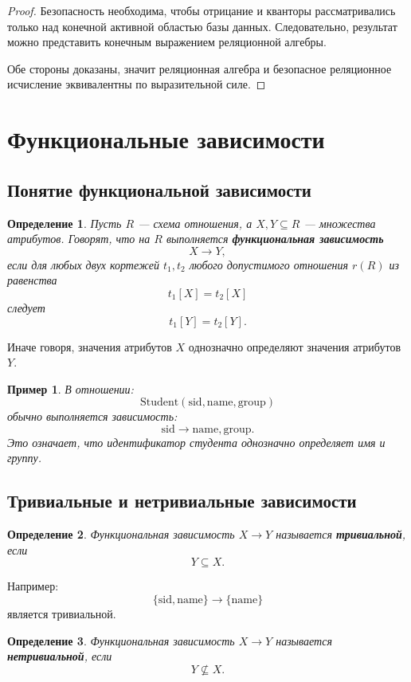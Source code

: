 \documentclass[12pt,a4paper]{article}
\newtheorem{definition}{Определение}[section]
\newtheorem{example}{Пример}[section]
\theoremstyle{remark}
\begin{document}
\begin{proof}
Безопасность необходима, чтобы отрицание и кванторы рассматривались только над конечной активной областью базы данных. Следовательно, результат можно представить конечным выражением реляционной алгебры.

Обе стороны доказаны, значит реляционная алгебра и безопасное реляционное исчисление эквивалентны по выразительной силе.
\end{proof}

\section{Функциональные зависимости}

\subsection{Понятие функциональной зависимости}

\begin{definition}
Пусть $R$ --- схема отношения, а $X,Y \subseteq R$ --- множества атрибутов.
Говорят, что на $R$ выполняется \textbf{функциональная зависимость}
\[
X \to Y,
\]
если для любых двух кортежей $t_1,t_2$ любого допустимого отношения $r(R)$ из равенства
\[
t_1[X] = t_2[X]
\]
следует
\[
t_1[Y] = t_2[Y].
\]
\end{definition}

Иначе говоря, значения атрибутов $X$ однозначно определяют значения атрибутов $Y$.

\begin{example}
В отношении:
\[
\text{Student}(\text{sid}, \text{name}, \text{group})
\]
обычно выполняется зависимость:
\[
\text{sid} \to \text{name}, \text{group}.
\]
Это означает, что идентификатор студента однозначно определяет имя и группу.
\end{example}

\subsection{Тривиальные и нетривиальные зависимости}

\begin{definition}
Функциональная зависимость $X \to Y$ называется \textbf{тривиальной}, если
\[
Y \subseteq X.
\]
\end{definition}

Например:
\[
\{\text{sid}, \text{name}\} \to \{\text{name}\}
\]
является тривиальной.

\begin{definition}
Функциональная зависимость $X \to Y$ называется \textbf{нетривиальной}, если
\[
Y \nsubseteq X.
\]
\end{definition}
\end{document}
